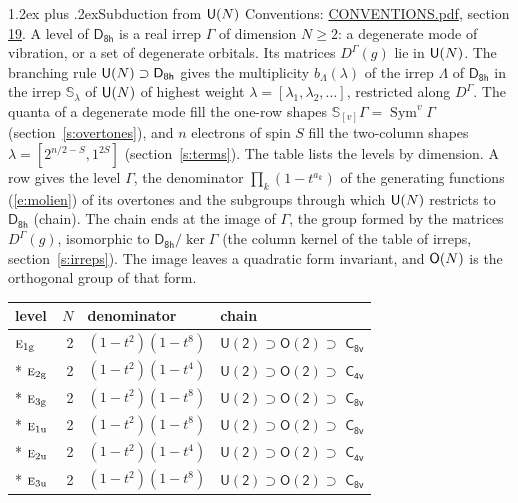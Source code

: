 \documentclass[10pt,a4paper]{article}
\makeatletter
\renewcommand\section{\@startsection{section}{1}{\z@}{-3ex plus -1ex minus -.2ex}%
  {1.2ex plus .2ex}{\normalfont\large\sffamily\bfseries\color{parttitle}}}
\numberwithin{equation}{section}
\newcommand{\grp}[1]{\mathsf{#1}}
\newcommand{\irr}[1]{\text{\normalfont\scshape #1}}
\newcommand{\ptag}[1]{\mathrm{#1}}
\newcommand{\repD}[1]{D^{#1}}
\newcommand{\schur}[1]{\mathbb{S}_{#1}}
\newcommand{\shape}[1]{[#1]}
\makeatother
\begin{document}
\section{Subduction from \texorpdfstring{$\grp{U(\mathnormal{N})}$}{U(N)}}\label{s:unitary}
Conventions: \href{../../CONVENTIONS.pdf}{CONVENTIONS.pdf}, section \href{../../CONVENTIONS.pdf\#conv.19}{19}.
\leavevmode\label{n:local.level.dimension}A level of $\grp{D_{8h}}$ is a real irrep $\Gamma$ of dimension $N \ge 2$: a degenerate mode of vibration, or a set of degenerate orbitals. \label{n:group.unitary}Its matrices $\repD{\Gamma}(g)$ lie in $\grp{U(\mathnormal{N})}$. \label{n:irrep.schur}\label{n:shape.partition}\label{n:local.partition}\label{n:function.multiplicity.unitary}The branching rule $\grp{U(\mathnormal{N})} \supset \grp{D_{8h}}$ gives the multiplicity $b_\Lambda(\lambda)$ of the irrep $\Lambda$ of $\grp{D_{8h}}$ in the irrep $\schur{\lambda}$ of $\grp{U(\mathnormal{N})}$ of highest weight $\lambda = \shape{\lambda_1, \lambda_2, \dots}$, restricted along $\repD{\Gamma}$. \label{n:local.partition.power}\label{n:local.electrons}\label{n:local.spin}The quanta of a degenerate mode fill the one-row shapes $\schur{\shape{v}}\Gamma = \operatorname{Sym}^{v}\Gamma$ (section~\ref{s:overtones}), and $n$ electrons of spin $S$ fill the two-column shapes $\lambda = \shape{2^{n/2-S}, 1^{2S}}$ (section~\ref{s:terms}).
The table lists the levels by dimension. \label{n:head.level}\label{n:head.denominator}\label{n:index.overtone.denominator}\label{n:head.chain}A row gives the level $\Gamma$, the denominator $\prod_k (1 - t^{a_k})$ of the generating functions (\ref{e:molien}) of its overtones and the subgroups through which $\grp{U(\mathnormal{N})}$ restricts to $\grp{D_{8h}}$ (chain). The chain ends at the image of $\Gamma$, the group formed by the matrices $\repD{\Gamma}(g)$, isomorphic to $\grp{D_{8h}}/\ker\Gamma$ (the column kernel of the table of irreps, section~\ref{s:irreps}). The image leaves a quadratic form invariant, and $\grp{O(\mathnormal{N})}$ is the orthogonal group of that form.
{\small\begin{longtable}{@{}lrll@{}}\toprule
level & $N$ & denominator & chain\\\midrule\endhead
\bottomrule\endfoot\endlastfoot
$\irr{e}_{1\ptag{g}}$ & 2 & $(1-t^{2})(1-t^{8})$ & $\grp{U(2)} \supset \grp{O(2)} \supset$ \href{C8v.pdf}{$\grp{C_{8v}}$}\\*
$\irr{e}_{2\ptag{g}}$ & 2 & $(1-t^{2})(1-t^{4})$ & $\grp{U(2)} \supset \grp{O(2)} \supset$ \href{C4v.pdf}{$\grp{C_{4v}}$}\\*
$\irr{e}_{3\ptag{g}}$ & 2 & $(1-t^{2})(1-t^{8})$ & $\grp{U(2)} \supset \grp{O(2)} \supset$ \href{C8v.pdf}{$\grp{C_{8v}}$}\\*
$\irr{e}_{1\ptag{u}}$ & 2 & $(1-t^{2})(1-t^{8})$ & $\grp{U(2)} \supset \grp{O(2)} \supset$ \href{C8v.pdf}{$\grp{C_{8v}}$}\\*
$\irr{e}_{2\ptag{u}}$ & 2 & $(1-t^{2})(1-t^{4})$ & $\grp{U(2)} \supset \grp{O(2)} \supset$ \href{C4v.pdf}{$\grp{C_{4v}}$}\\*
$\irr{e}_{3\ptag{u}}$ & 2 & $(1-t^{2})(1-t^{8})$ & $\grp{U(2)} \supset \grp{O(2)} \supset$ \href{C8v.pdf}{$\grp{C_{8v}}$}\\
\bottomrule\end{longtable}}
\end{document}
